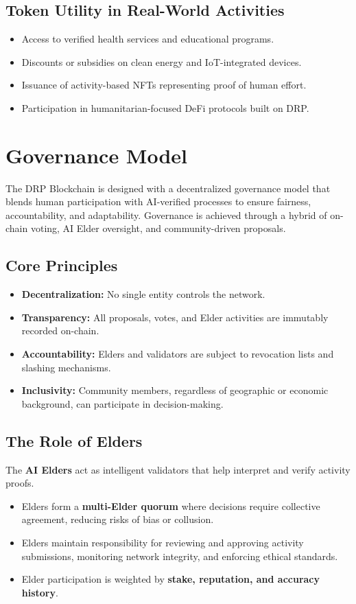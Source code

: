 \documentclass[11pt,a4paper]{article}
\begin{document}
\subsection{Token Utility in Real-World Activities}
\begin{itemize}
    \item Access to verified health services and educational programs.  
    \item Discounts or subsidies on clean energy and IoT-integrated devices.  
    \item Issuance of activity-based NFTs representing proof of human effort.  
    \item Participation in humanitarian-focused DeFi protocols built on DRP.  
\end{itemize}

\section{Governance Model}

The DRP Blockchain is designed with a decentralized governance model that blends human participation with AI-verified processes to ensure fairness, accountability, and adaptability. Governance is achieved through a hybrid of on-chain voting, AI Elder oversight, and community-driven proposals.

\subsection{Core Principles}
\begin{itemize}
    \item \textbf{Decentralization:} No single entity controls the network.  
    \item \textbf{Transparency:} All proposals, votes, and Elder activities are immutably recorded on-chain.  
    \item \textbf{Accountability:} Elders and validators are subject to revocation lists and slashing mechanisms.  
    \item \textbf{Inclusivity:} Community members, regardless of geographic or economic background, can participate in decision-making.  
\end{itemize}

\subsection{The Role of Elders}
The \textbf{AI Elders} act as intelligent validators that help interpret and verify activity proofs.  
\begin{itemize}
    \item Elders form a \textbf{multi-Elder quorum} where decisions require collective agreement, reducing risks of bias or collusion.  
    \item Elders maintain responsibility for reviewing and approving activity submissions, monitoring network integrity, and enforcing ethical standards.  
    \item Elder participation is weighted by \textbf{stake, reputation, and accuracy history}.  
\end{itemize}
\end{document}
